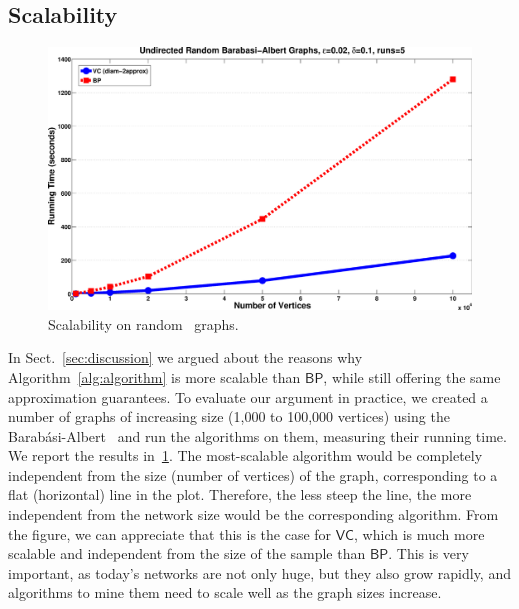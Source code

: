 \subsection{Scalability}\label{sec:scalability}
\begin{figure}[ht]
  \centering
  \includegraphics[width=.45\textwidth,keepaspectratio]{figures/eps/random-time}
  \caption{Scalability on random~\citep{BarabasiA99} graphs.}
  \label{fig:random:time}
\end{figure}
In Sect.~\ref{sec:discussion} we argued about the reasons why
Algorithm~\ref{alg:algorithm} is more scalable than $\mathsf{BP}$, while still
offering the same approximation guarantees. To evaluate our argument in practice, we
created a number of graphs of increasing size (1,000 to 100,000 vertices) using
the Barab\'asi-Albert~\citep{BarabasiA99} and run the algorithms on them,
measuring their running time. We report the results in~\cref{fig:random:time}.
The most-scalable algorithm would be completely independent from the size
(number of vertices) of the graph, corresponding to a flat (horizontal) line in
the plot. Therefore, the less steep the line, the more independent from the
network size would be the corresponding algorithm. From the figure, we can
appreciate that this is the case for $\mathsf{VC}$, which is much more scalable
and independent from the size of the sample than $\mathsf{BP}$. This is very
important, as today's networks are not only huge, but they also grow rapidly,
and algorithms to mine them need to scale well as
the graph sizes increase.


